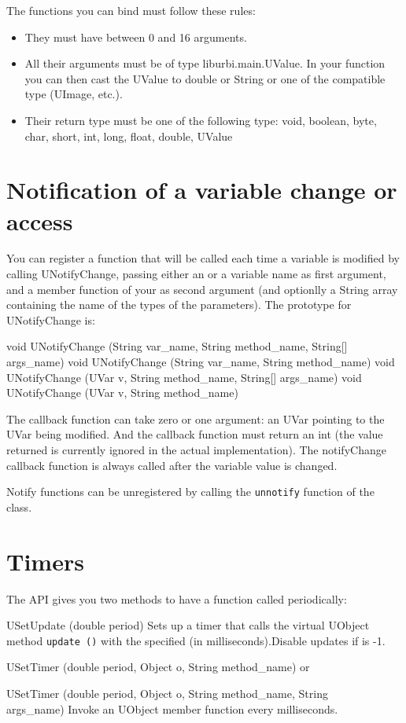 The functions you can bind must follow these rules:
\begin{itemize}
\item They must have between 0 and 16 arguments.
\item All their arguments must be of type liburbi.main.UValue. In your function
 you can then cast the UValue to double or String or one of the compatible
 type (UImage, etc.).
\item Their return type must be one of the following type:
 void, boolean, byte, char, short, int, long, float, double, UValue
\end{itemize}


\section{Notification of a variable change or access}
\label{sec:uob:apijava:uvar-notify}

You can register a function that will be called each time a
variable is modified by calling UNotifyChange, passing either an \UVar
or a variable name as first argument, and a member function of
your \UObject as second argument (and optionlly a String array containing
the name of the types of the parameters). The prototype for UNotifyChange is:

\begin{cxx}
void UNotifyChange (String var_name, String method_name, String[] args_name)
void UNotifyChange (String var_name, String method_name)
void UNotifyChange (UVar v, String method_name, String[] args_name)
void UNotifyChange (UVar v, String method_name)
\end{cxx}

The callback function can take zero or one argument: an UVar pointing to the
UVar being modified. And the callback function must return an int (the value
returned is currently ignored in the actual implementation).
The notifyChange callback function is always called after the variable value
is changed.

Notify functions can be unregistered by calling the \lstinline|unnotify|
function of the \UVar class.


\section{Timers}
\label{sec:uob:apijava:timers}

The API gives you two methods to have a function called periodically:

\begin{cxxapi}
\item[USetUpdate (double period)] Sets up a timer that calls the virtual
  UObject method \lstinline{update ()} with the specified  (in
  milliseconds).Disable updates if  is -1.
\item[USetTimer (double period, Object o, String method\_name)] or
\item[USetTimer (double period, Object o, String method\_name, String\[\] args\_name)]
 Invoke an UObject member function  every  milliseconds.
\end{cxxapi}



